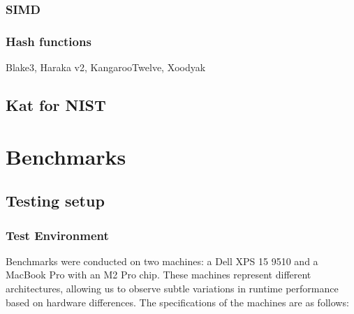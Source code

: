 \documentclass[twoside,11pt]{report}
\theoremstyle{definition}
\theoremstyle{plain}
\begin{document}

\subsection{SIMD}\label{sub:simd} %


\subsection{Hash functions}
Blake3, Haraka v2, KangarooTwelve, Xoodyak

\section{Kat for NIST}\label{sub:kat_for_nist} %



\chapter{Benchmarks}\label{ch:bench}

\section{Testing setup}\label{sub:testing_setup}

\subsection{Test Environment}\label{sub:test_env}
Benchmarks were conducted on two machines: a Dell XPS 15 9510 and a MacBook Pro with an M2 Pro chip. These machines represent different architectures, allowing us to observe subtle variations in runtime performance based on hardware differences. The specifications of the machines are as follows:
\end{document}
